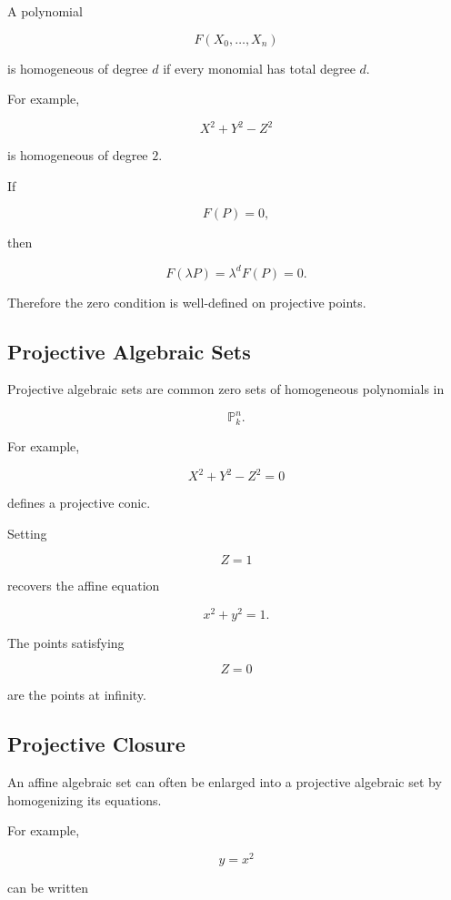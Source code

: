 A polynomial

\[
F(X_0,\ldots,X_n)
\]

is homogeneous of degree \(d\) if every monomial has total degree \(d\).

For example,

\[
\boxed{
X^2+Y^2-Z^2
}
\]

is homogeneous of degree \(2\).

If

\[
F(P)=0,
\]

then

\[
F(\lambda P)
=
\lambda^dF(P)
=
0.
\]

Therefore the zero condition is well-defined on projective points.

\subsection{Projective Algebraic Sets}
\label{subsec:projective-algebraic-sets}

Projective algebraic sets are common zero sets of homogeneous polynomials in

\[
\mathbb{P}^n_k.
\]

For example,

\[
\boxed{
X^2+Y^2-Z^2=0
}
\]

defines a projective conic.

Setting

\[
Z=1
\]

recovers the affine equation

\[
x^2+y^2=1.
\]

The points satisfying

\[
Z=0
\]

are the points at infinity.

\subsection{Projective Closure}
\label{subsec:projective-closure}

An affine algebraic set can often be enlarged into a projective algebraic
set by homogenizing its equations.

For example,

\[
y=x^2
\]

can be written

